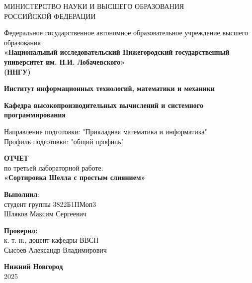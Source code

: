 \documentclass[a4paper,12pt]{article}
\begin{document}
\begin{titlepage}
\centering
{МИНИСТЕРСТВО НАУКИ И ВЫСШЕГО ОБРАЗОВАНИЯ\\
РОССИЙСКОЙ ФЕДЕРАЦИИ}

\vspace{1em}

Федеральное государственное автономное образовательное учреждение высшего образования\\
\textbf{«Национальный исследовательский Нижегородский государственный университет им. Н.И. Лобачевского»}\\
\textbf{(ННГУ)}

\vspace{2em}

\textbf{Институт информационных технологий, математики и механики}

\vspace{1em}

\textbf{Кафедра высокопроизводительных вычислений и системного программирования}

\vspace{2em}

Направление подготовки: "Прикладная математика и информатика"\\
Профиль подготовки: "общий профиль" \\

\vspace{4em}


\textbf{\Large ОТЧЕТ}\\
по третьей лабораторной работе:\\
\vspace{1em}
\textbf{«Сортировка Шелла с простым слиянием»}

\begin{flushright}
\textbf{Выполнил}:\\[5pt]
студент группы {3822Б1ПМоп3} \\[1em]
{Шляков Максим Сергеевич}
\end{flushright}

\vspace{1em}

\begin{flushright}

\noindent\textbf{Проверил:} \\[5pt]
к. т. н., доцент кафедры ВВСП \\[5pt]
{Сысоев Александр Владимирович}
\end{flushright}

\vspace{1em}

\vfill
\textbf{Нижний Новгород}\\
2025
\end{titlepage}
\end{document}
